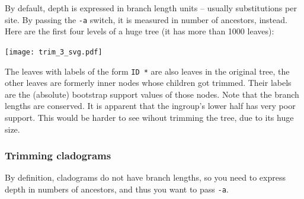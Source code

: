 By default, depth is expressed in branch length units -- usually substitutions
per site. By passing the \texttt{-a} switch, it is measured in number of
ancestors, instead. Here are the first four levels of a huge tree (it has more than 1000 leaves):


\begin{center}
\texttt{[image: trim\_3\_svg.pdf]}
\end{center}

\noindent{}The leaves with labels of the form \texttt{ID *} are also leaves in
the original tree, the other leaves are formerly inner nodes whose children got
trimmed.  Their labels are the (absolute) bootstrap support values of those
nodes. Note that the branch lengths are conserved. It is apparent that the
ingroup's lower half has very poor support. This would be harder to see wihout
trimming the tree, due to its huge size.

\subsubsection{Trimming cladograms}

By definition, cladograms do not have branch lengths, so you need to express depth in numbers of ancestors, and thus you want to pass \texttt{-a}.
